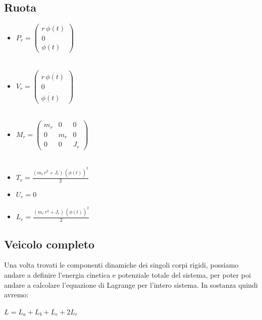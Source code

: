 \subsection{Ruota}
\begin{itemize}
	
	\item \textbf{$P_r = \left(\begin{array}{c}
		r\,\phi \left(t\right)\\
		0\\
		\phi \left(t\right)
		\end{array}\right)$}
	\\\\
	\item \textbf{$V_r = \left(\begin{array}{c}
		r\,\dot{\phi \left(t\right)}\\
		0\\
		\dot{\phi \left(t\right)}
		\end{array}\right)$}
	\\\\
	\item \textbf{$M_r = \left(\begin{array}{ccc}
		m_r  & 0 & 0\\
		0 & m_r  & 0\\
		0 & 0 & J_r 
		\end{array}\right)$} \label{matrix:mr}
	\\\\
	\item \textbf{$T_r = \frac{{\left(m_r \,r^2 +J_r \right)}\,{{\left(\dot{\phi \left(t\right)}\right)}}^2 }{2}$}
	\\
	\item \textbf{$U_r = 0$}
	\\
	\item \textbf{$L_r = \frac{{\left(m_r \,r^2 +J_r \right)}\,{{\left(\dot{\phi \left(t\right)}\right)}}^2 }{2}$}
\end{itemize}

\subsection{Veicolo completo}
Una volta trovati le componenti dinamiche dei singoli corpi rigidi, possiamo andare a definire l'energia cinetica e potenziale totale del sistema, per poter poi andare a calcolare l'equazione di Lagrange per l'intero sistema.
In sostanza quindi avremo:
\begin{center}
	$L = L_a + L_b + L_c + 2 L_r$
\end{center}

